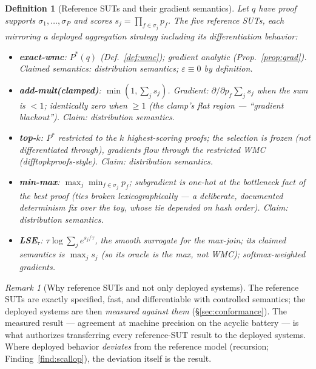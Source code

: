 \documentclass[10pt]{article}
\newtheorem{definition}{Definition}[section]
\theoremstyle{remark}
\newtheorem{remark}{Remark}
\newcommand{\eps}{\varepsilon}
\begin{document}
\begin{definition}[Reference SUTs and their gradient semantics]\label{def:suts}
Let $q$ have proof supports $\sigma_1,\dots,\sigma_P$ and scores $s_j = \prod_{f\in\sigma_j} p_f$.
The five reference SUTs, each mirroring a deployed aggregation strategy \emph{including its
differentiation behavior}:
\begin{itemize}[leftmargin=2em]
\item \textbf{exact-wmc}: $P^*(q)$ (Def.~\ref{def:wmc}); gradient analytic
  (Prop.~\ref{prop:grad}). Claimed semantics: distribution semantics; $\eps \equiv 0$ by
  definition.
\item \textbf{add-mult(clamped)}: $\min(1, \sum_j s_j)$. Gradient: $\partial/\partial p_f \sum_j
  s_j$ when the sum is $<1$; \emph{identically zero} when $\ge 1$ (the clamp's flat region ---
  ``gradient blackout''). Claim: distribution semantics.
\item \textbf{top-$k$}: $P^*$ restricted to the $k$ highest-scoring proofs; the selection is
  \emph{frozen} (not differentiated through), gradients flow through the restricted WMC
  (difftopkproofs-style). Claim: distribution semantics.
\item \textbf{min-max}: $\max_j \min_{f\in\sigma_j} p_f$; subgradient is \emph{one-hot} at the
  bottleneck fact of the best proof (ties broken lexicographically --- a deliberate, documented
  determinism fix over the toy, whose tie depended on hash order). Claim: distribution semantics.
\item \textbf{LSE$_\tau$}: $\tau\log\sum_j e^{s_j/\tau}$, the smooth surrogate for the max-join;
  its \emph{claimed} semantics is $\max_j s_j$ (so its oracle is the max, not WMC); softmax-weighted
  gradients.
\end{itemize}
\end{definition}

\begin{remark}[Why reference SUTs and not only deployed systems]\label{rem:why-refs}
The reference SUTs are exactly specified, fast, and differentiable with controlled semantics; the
deployed systems are then \emph{measured against them} (\S\ref{sec:conformance}). The measured
result --- agreement at machine precision on the acyclic battery --- is what authorizes
transferring every reference-SUT result to the deployed systems. Where deployed behavior
\emph{deviates} from the reference model (recursion; Finding~\ref{find:scallop}), the deviation
itself is the result.
\end{remark}
\end{document}
